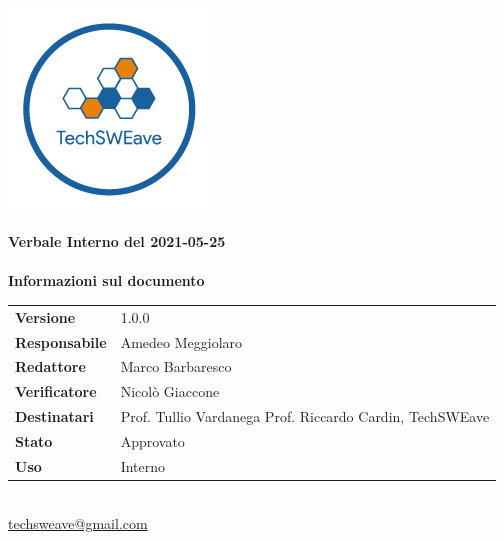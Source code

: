 \documentclass[a4paper]{article}
\begin{document}
\begin{titlepage}
    \begin{center}
        \includegraphics{../../../../Images/logo.png}\\
        \vspace{20px}
        \textcolor{logo}{\hrulefill}\\
        \vspace{20px}
        \textbf{\huge\textcolor{logo}{Verbale Interno del 2021-05-25}}\\
        \vspace{10px}
        \textcolor{logo}{\hrulefill}\\
        \vspace{40px}
        \textbf{\Large Informazioni sul documento}\\
        \vspace{20px}
        \begin{tabular}{p{100px} | p{100px}}
            \textbf{Versione}     & 1.0.0                                                                      \\
            \textbf{Responsabile} & Amedeo Meggiolaro                                                          \\
            \textbf{Redattore}    & Marco Barbaresco                                                           \\
            \textbf{Verificatore} & Nicolò Giaccone                                                            \\
            \textbf{Destinatari}  & Prof. Tullio Vardanega \newline Prof. Riccardo Cardin, \newline TechSWEave \\
            \textbf{Stato}        & Approvato                                                                  \\
            \textbf{Uso}          & Interno                                                                    \\
        \end{tabular}\\
        \vspace{60px}
        \href{mailto:techsweave@gmail.com}{techsweave@gmail.com}\\

    \end{center}
\end{titlepage}
\end{document}
